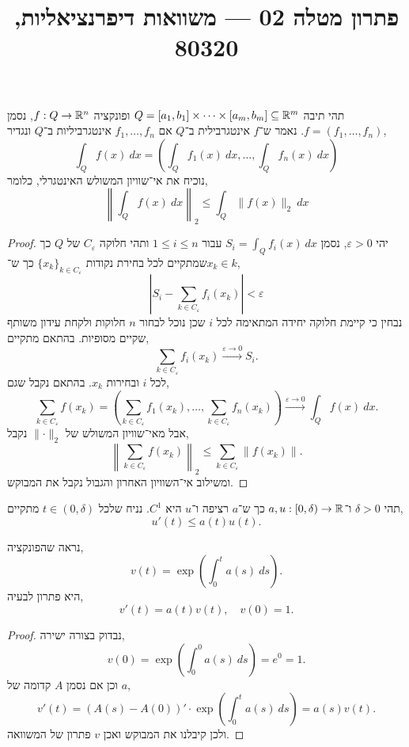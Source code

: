 
\title{פתרון מטלה 02 --- משוואות דיפרנציאליות, 80320}

\DeclareMathOperator{\sgn}{sgn}


\maketitle
\maketitleprint[blue]{}

\question{}
תהי תיבה $Q = [a_1, b_1] \times \cdots \times [a_m, b_m] \subseteq \mathbb{R}^m$ ופונקציה $f : Q \to \mathbb{R}^n$, נסמן $f = (f_1, \ldots, f_n)$.
נאמר ש־$f$ אינטגרבילית ב־$Q$ אם $f_1, \ldots, f_n$ אינטגרביליות ב־$Q$ ונגדיר,
\[
	\int_Q f(x)\ dx
	= \left(\int_Q f_1(x)\ dx, \ldots, \int_Q f_n(x)\ dx\right)
\]
נוכיח את אי־שוויון המשולש האינטגרלי, כלומר,
\[
	\left\lVert \int_Q f(x)\ dx \right\rVert_2
	\le \int_Q \lVert f(x) \rVert_2\ dx
\]
\begin{proof}
	יהי $\varepsilon > 0$, נסמן $S_i = \int_Q f_i(x)\ dx$ עבור $1 \le i \le n$ ותהי חלוקה $C_\varepsilon$ של $Q$ כך שמתקיים לכל בחירת נקודות ${\{ x_k \}}_{k \in C_\varepsilon}$ כך ש־$x_k \in k$,
	\[
		\left\lvert S_i - \sum_{k \in C_\varepsilon} f_i(x_k) \right\rvert
		< \varepsilon
	\]
	נבחין כי קיימת חלוקה יחידה המתאימה לכל $i$ שכן נוכל לבחור $n$ חלוקות ולקחת עידון משותף שקיים מסופיות.
	בהתאם מתקיים,
	\[
		\sum_{k \in C_\varepsilon} f_i(x_k)
		\xrightarrow{\varepsilon \to 0} S_i
	.\]
	לכל $i$ ובחירות $x_k$.
	בהתאם נקבל שגם,
	\[
		\sum_{k \in C_\varepsilon} f(x_k)
		= \left( \sum_{k \in C_\varepsilon} f_1(x_k), \ldots, \sum_{k \in C_\varepsilon} f_n(x_k) \right)
		\xrightarrow{\varepsilon \to 0} \int_Q f(x)\ dx
	.\]
	אבל מאי־שוויון המשולש של $\lVert \cdot \rVert_2$ נקבל,
	\[
		\left\lVert \sum_{k \in C_\varepsilon} f(x_k) \right\rVert_2
		\le \sum_{k \in C_\varepsilon} \lVert f(x_k) \rVert
	.\]
	ומשילוב אי־השוויון האחרון והגבול נקבל את המבוקש.
\end{proof}

\question{}
תהי $\delta > 0$ ו־$a, u : [0, \delta) \to \mathbb{R}$ כך ש־$a$ רציפה ו־$u$ היא $C^1$.
נניח שלכל $t \in (0, \delta)$ מתקיים,
\[
	u'(t) \le a(t) u(t)
.\]

\subquestion{}
נראה שהפונקציה,
\[
	v(t)
	= \exp\left(\int_0^t a(s)\ ds\right)
.\]
היא פתרון לבעיה,
\[
	v'(t) = a(t) v(t),
	\quad
	v(0) = 1
.\]
\begin{proof}
	נבדוק בצורה ישירה,
	\[
		v(0)
		= \exp\left(\int_0^0 a(s)\ ds\right)
		= e^0
		= 1
	.\]
	וכן אם נסמן $A$ קדומה של $a$,
	\[
		v'(t)
		= (A(s) - A(0))' \cdot \exp\left(\int_0^t a(s)\ ds\right)
		= a(s) v(t)
	.\]
	ולכן קיבלנו את המבוקש ואכן $v$ פתרון של המשוואה.
\end{proof}

